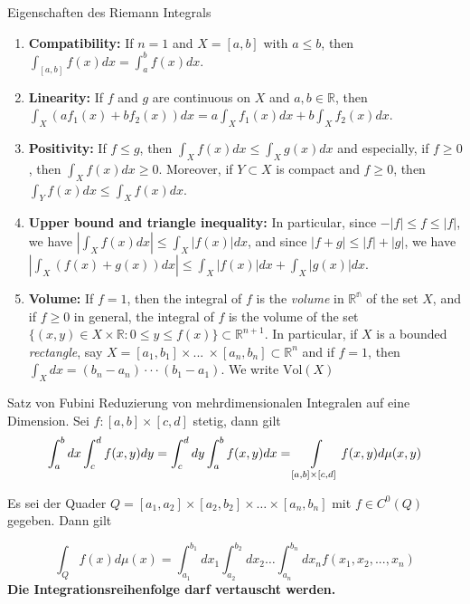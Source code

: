 \begin{Satz}{Eigenschaften des Riemann Integrals}{}
    \begin{enumerate}
        \def\labelenumi{\arabic{enumi}.}
        \item
          \textbf{Compatibility:} If \textbf{\(n=1\)} and \(X=[a,b]\) with
          \(a\leq b\), then \(\int_{[a,b]}f(x)dx=\int_a^bf(x)dx\).
        \item
          \textbf{Linearity:} If \(f\) and \(g\) are continuous on \(X\) and
          \(a,b \in \mathbb{R}\), then
          \(\int_X(af_1(x)+bf_2(x))dx = a\int_Xf_1(x)dx+b\int_Xf_2(x)dx\).
        \item
          \textbf{Positivity:} If \(f\leq g\), then
          \(\int_Xf(x)dx\leq\int_Xg(x)dx\) and especially, if \(f \geq 0\), then
          \(\int_Xf(x)dx \geq 0\). Moreover, if \(Y \subset X\) is compact and
          \(f\geq 0\), then \(\int_Yf(x)dx\leq\int_Xf(x)dx\).
        \item
          \textbf{Upper bound and triangle inequality:} In particular, since
          \(-|f|\leq f \leq |f|\), we have
          \(\left| \int_Xf(x)dx \right| \leq \int_X|f(x)|dx\), and since
          \(|f+g| \leq |f| + |g|\), we have
          \(\left| \int_X(f(x)+g(x))dx \right| \leq \int_X|f(x)|dx + \int_X|g(x)|dx\).
        \item
          \textbf{Volume:} If \(f=1\), then the integral of \(f\) is the
          \emph{volume} in \(\mathbb{R^n}\) of the set \(X\), and if \(f\geq 0\)
          in general, the integral of \(f\) is the volume of the set
          \(\{(x,y) \in X \times \mathbb{R} : 0 \leq y \leq f(x)\} \subset \mathbb{R}^{n+1}\).
          In particular, if \(X\) is a bounded \emph{rectangle}, say
          \(X = [a_1,b_1] \times ... \ \times [a_n, b_n] \subset \mathbb{R}^n\)
          and if \(f=1\), then \(\int_Xdx=(b_n-a_n) \cdot\cdot\cdot(b_1-a_1)\).
          We write $\text{Vol}(X)$
        \end{enumerate}
  
\end{Satz}
\begin{Satz}{Satz von Fubini}{}
    Reduzierung von mehrdimensionalen Integralen auf eine Dimension. Sei $f: [a,b] \times [c, d]$ stetig, dann gilt
    \[ \int_a^b dx \int_c^d f(x, y) dy = \int_c^d dy \int_a^b f(x, y) dx = \int\displaylimits_{[a,b] \times [c, d]} f(x, y) d\mu(x, y)   \]

    Es sei der Quader $Q = [a_1,a_2] \times [a_2, b_2] \times \dots \times [a_n, b_n]$ mit $f \in C^0(Q)$ gegeben. Dann gilt

    \[
        \int_Q f(x) d\mu(x) = \int_{a_1}^{b_1} dx_1 \int_{a_2}^{b_2} dx_2 \dots \int_{a_n}^{b_n} dx_n f(x_1, x_2,...,x_n)
    \]
    \textbf{Die Integrationsreihenfolge darf vertauscht werden.}\\
    
\end{Satz}

